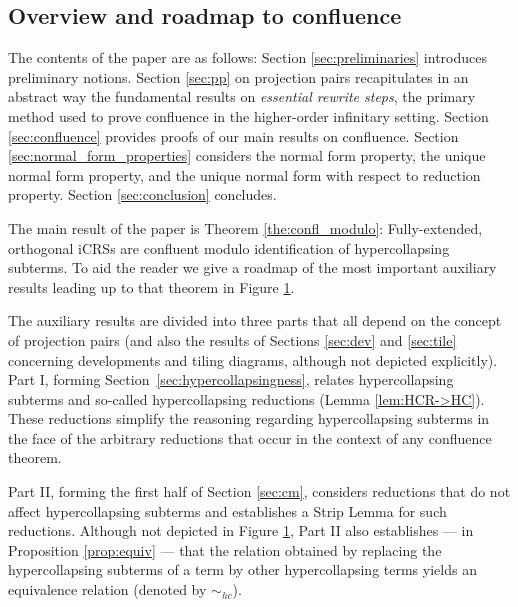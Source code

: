 \documentclass{LMCS}
\theoremstyle{plain}
\theoremstyle{definition}
\newcommand{\simhc}{\sim_{hc}}
\begin{document}
\subsection{Overview and roadmap to confluence}

The contents of the paper are as follows: Section \ref{sec:preliminaries} introduces preliminary notions. Section \ref{sec:pp} on projection pairs recapitulates in an abstract way the fundamental results on \emph{essential rewrite steps}, the primary method used to prove confluence in the higher-order infinitary setting. Section \ref{sec:confluence} provides
proofs of our main results on confluence.
Section \ref{sec:normal_form_properties} considers
the normal form property, the unique normal form property, and the
unique normal form with respect to reduction property. 
Section \ref{sec:conclusion} concludes.



The main result of the paper is Theorem \ref{the:confl_modulo}:
Fully-extended, orthogonal iCRSs are confluent modulo identification of hypercollapsing subterms. To aid the reader we give a roadmap of the most important auxiliary results leading up to that theorem in Figure \ref{fig:road}.


\begin{figure}[omitted: a diagram of this paper's results, not reproduced here]\label{fig:road}\end{figure}

The auxiliary results are divided into three parts that all depend on the concept of projection pairs (and also the results of Sections \ref{sec:dev} and \ref{sec:tile} concerning developments and tiling diagrams, although not depicted explicitly). Part I, forming Section~\ref{sec:hypercollapsingness}, relates hypercollapsing subterms and so-called hypercollapsing reductions (Lemma  \ref{lem:HCR->HC}). These reductions simplify the reasoning regarding hypercollapsing subterms in the face of the arbitrary reductions that occur in the context of any confluence theorem.

Part II, forming the first half of Section \ref{sec:cm}, considers reductions that do not affect hypercollapsing subterms and establishes a Strip Lemma for such reductions. Although not depicted in Figure \ref{fig:road}, Part II also establishes --- in Proposition \ref{prop:equiv} --- that the relation obtained by replacing the hypercollapsing subterms of a term by other hypercollapsing terms yields an equivalence relation (denoted by $\simhc$).
\end{document}
